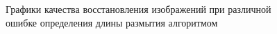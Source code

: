 \begin{figure}[H]
\begin{minipage}[t]{0.46\linewidth}
  \\ 
\end{minipage}
\hfill
\begin{minipage}[t]{0.46\linewidth}
  \\
\end{minipage}
\caption{ Графики качества восстановления изображений при различной ошибке определения длины размытия алгоритмом }
\label{ris:plots_l}
\end{figure}


